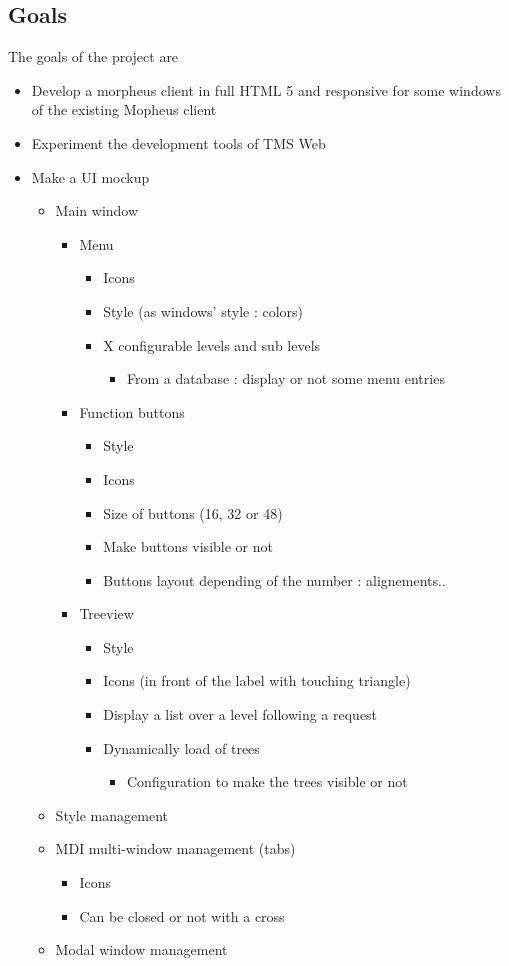 \documentclass[a4paper, 12pt, french]{article}
\newcommand{\bdot}{\item[\color{ssiYellow}\ding{108}]}
\newcommand{\bdotoutlined}{\item[\color{ssiYellow}\ding{109}]}
\newcommand{\bsquare}{\item[\color{ssiYellow}\ding{110}]}
\newcommand{\bsquareoutlined}{\item[\color{ssiYellow}\ding{111}]}
\newcommand{\bdiamond}{\item[\color{ssiYellow}\ding{117}]}
\begin{document}
		\subsection{Goals}
			The goals of the project are 
			\begin{itemize}
				\bdot{Develop a morpheus client in full HTML 5 and responsive for some windows of the existing Mopheus client}
				\bdot{Experiment the development tools of TMS Web}
				\bdot{Make a UI mockup}
					\begin{itemize}
						\bdotoutlined{Main window}
							\begin{itemize}
								\bsquare{Menu}
									\begin{itemize}
										\bsquareoutlined{Icons}
										\bsquareoutlined{Style (as windows' style : colors)}
										\bsquareoutlined{X configurable levels and sub levels}
											\begin{itemize}
												\bdiamond{From a database : display or not some menu entries}
											\end{itemize}
									\end{itemize}
								\bsquare{Function buttons}
									\begin{itemize}
										\bsquareoutlined{Style}
										\bsquareoutlined{Icons}
										\bsquareoutlined{Size of buttons (16, 32 or 48)}
										\bsquareoutlined{Make buttons visible or not}
										\bsquareoutlined{Buttons layout depending of the number : alignements..}
									\end{itemize}
								\bsquare{Treeview}
									\begin{itemize}
										\bsquareoutlined{Style}
										\bsquareoutlined{Icons (in front of the label with touching triangle)}
										\bsquareoutlined{Display a list over a level following a request}
										\bsquareoutlined{Dynamically load of trees}
											\begin{itemize}
												\bdiamond{Configuration to make the trees visible or not}
											\end{itemize}
									\end{itemize}
							\end{itemize}
						\bdotoutlined{Style management}
						\bdotoutlined{MDI multi-window management (tabs)}
							\begin{itemize}
								\bsquare{Icons}
								\bsquare{Can be closed or not with a cross}
							\end{itemize}
						\bdotoutlined{Modal window management}
							\begin{itemize}

\end{itemize}
\end{itemize}
\end{itemize}
\end{document}
